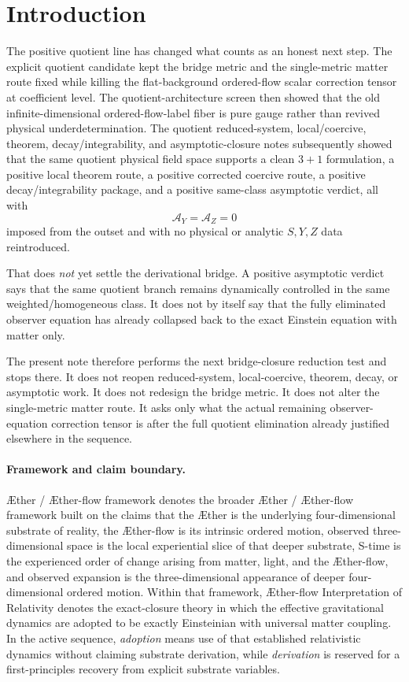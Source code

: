 \documentclass[11pt]{article}
\newcommand{\Aether}{\AE{}ther}
\newcommand{\Aflow}{\AE{}ther-flow}
\newcommand{\TheoryName}{\Aflow{} Interpretation of Relativity}
\newcommand{\TheoryProgram}{\Aether{} / \Aflow{} framework}
\newcommand{\AY}{\mathcal A_Y}
\newcommand{\AZ}{\mathcal A_Z}
\begin{document}
\section{Introduction}

The positive quotient line has changed what counts as an honest next step. The explicit quotient candidate kept the bridge metric and the single-metric matter route fixed while killing the flat-background ordered-flow scalar correction tensor at coefficient level. The quotient-architecture screen then showed that the old infinite-dimensional ordered-flow-label fiber is pure gauge rather than revived physical underdetermination. The quotient reduced-system, local/coercive, theorem, decay/integrability, and asymptotic-closure notes subsequently showed that the same quotient physical field space supports a clean \(3+1\) formulation, a positive local theorem route, a positive corrected coercive route, a positive decay/integrability package, and a positive same-class asymptotic verdict, all with
\[
\AY=\AZ=0
\]
imposed from the outset and with no physical or analytic \(S,Y,Z\) data reintroduced.

That does \emph{not} yet settle the derivational bridge. A positive asymptotic verdict says that the same quotient branch remains dynamically controlled in the same weighted/homogeneous class. It does not by itself say that the fully eliminated observer equation has already collapsed back to the exact Einstein equation with matter only.

The present note therefore performs the next bridge-closure reduction test and stops there. It does not reopen reduced-system, local-coercive, theorem, decay, or asymptotic work. It does not redesign the bridge metric. It does not alter the single-metric matter route. It asks only what the actual remaining observer-equation correction tensor is after the full quotient elimination already justified elsewhere in the sequence.

\paragraph{Framework and claim boundary.}
\TheoryProgram{} denotes the broader \Aether{} / \Aflow{} framework built on the claims that the \Aether{} is the underlying four-dimensional substrate of reality, the \Aflow{} is its intrinsic ordered motion, observed three-dimensional space is the local experiential slice of that deeper substrate, S-time is the experienced order of change arising from matter, light, and the \Aflow{}, and observed expansion is the three-dimensional appearance of deeper four-dimensional ordered motion. Within that framework, \TheoryName{} denotes the exact-closure theory in which the effective gravitational dynamics are adopted to be exactly Einsteinian with universal matter coupling. In the active sequence, \emph{adoption} means use of that established relativistic dynamics without claiming substrate derivation, while \emph{derivation} is reserved for a first-principles recovery from explicit substrate variables.
\end{document}
